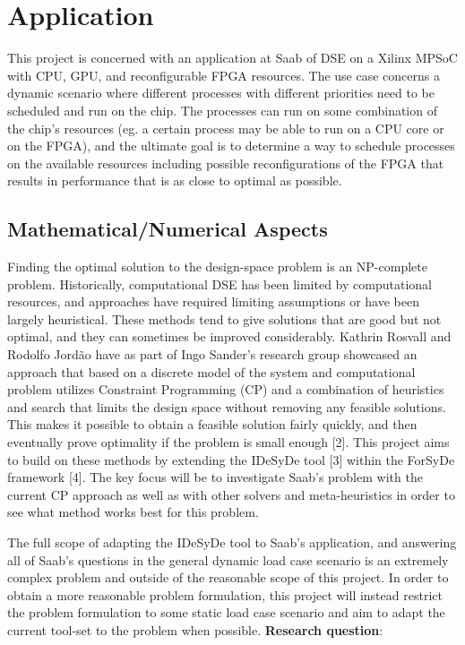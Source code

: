 \documentclass[12pt,notitlepage]{article}
\begin{document}
\section{Application}
This project is concerned with an application at Saab of DSE on a Xilinx MPSoC with CPU, GPU, and reconfigurable FPGA resources. The use case concerns a dynamic scenario where different processes with different priorities need to be scheduled and run on the chip. The processes can run on some combination of the chip's resources (eg. a certain process may be able to run on a CPU core or on the FPGA), and the ultimate goal is to determine a way to schedule processes on the available resources including possible reconfigurations of the FPGA that results in performance that is as close to optimal as possible.

\subsection{Mathematical/Numerical Aspects}
Finding the optimal solution to the design-space problem is an NP-complete problem. Historically, computational DSE has been limited by computational resources, and approaches have required limiting assumptions or have been largely heuristical. These methods tend to give solutions that are good but not optimal, and they can sometimes be improved considerably. Kathrin Rosvall and Rodolfo Jordão have as part of Ingo Sander's research group showcased an approach that based on a discrete model of the system and computational problem utilizes Constraint Programming (CP) and a combination of heuristics and search that limits the design space without removing any feasible solutions. This makes it possible to obtain a feasible solution fairly quickly, and then eventually prove optimality if the problem is small enough [2]. This project aims to build on these methods by extending the IDeSyDe tool [3] within the ForSyDe framework [4]. The key focus will be to investigate Saab's problem with the current CP approach as well as with other solvers and meta-heuristics in order to see what method works best for this problem.

The full scope of adapting the IDeSyDe tool to Saab's application, and answering all of Saab's questions in the general dynamic load case scenario is an extremely complex problem and outside of the reasonable scope of this project. In order to obtain a more reasonable problem formulation, this project will instead restrict the problem formulation to some static load case scenario and aim to adapt the current tool-set to the problem when possible.
\newline\newline
\noindent\textbf{Research question}:
\end{document}

